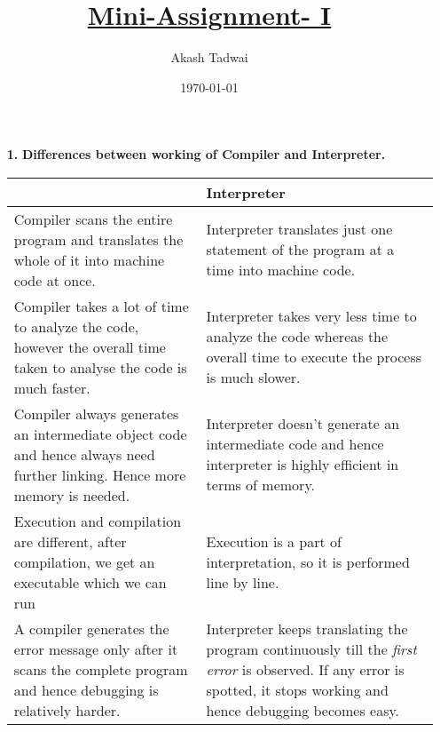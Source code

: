 \documentclass[english,a4paper,12pt]{article}
\title{\textbf{\underline{\Huge{Mini-Assignment- I }}}}
\author{Akash Tadwai}
\date{\today}
\begin{document}
\maketitle
\begin{enumerate}
   \item[\textbf{1.}] \textbf{Differences between working of Compiler and Interpreter.}

\begin{center}
\begin{tabular}{ || m{18em} || m{18em} ||}
\hline\hline
\centering { \textbf{Compiler}} & \hspace{2.5cm}\textbf{Interpreter} \\
\hline\hline
Compiler scans the entire program and translates the whole of it into machine code at once. & Interpreter translates just one statement of the program at a time into machine code.\\ 
\hline
Compiler takes a lot of time to analyze the code, however the overall time taken to analyse the code is much faster. & Interpreter takes very less time to analyze the code whereas the overall time to execute the process is much slower.\\ 
\hline
Compiler always generates an intermediate object code and hence always need further linking. Hence more memory is needed. &  Interpreter doesn't generate an intermediate code and hence interpreter is highly efficient in terms of memory.\\ 
\hline
Execution and compilation are different, after compilation, we get an executable which we can run & Execution is a part of interpretation, so it is performed line by line.\\ 
\hline
A compiler generates the error message only after it scans the complete program and hence debugging is relatively harder. & Interpreter keeps translating the program continuously till the \textit{first error} is observed. If any error is spotted, it stops working and hence debugging becomes easy.\\ 
\hline\hline
\end{tabular}
\end{center}

\end{enumerate}
\end{document}
